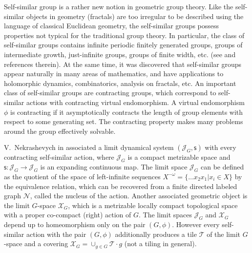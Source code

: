 \documentclass[12pt]{article}
\newcommand{\xmo}{X^{-\omega}}
\newcommand{\limGs}[1][G]{\mathcal{X}_{#1}}
\newcommand{\lims}[1][G]{\mathscr{J}_{#1}}
\newcommand{\si}{\mathsf{s}}
\newcommand{\tile}{\mathscr{T}}
\newcommand{\nucl}{\mathcal{N}}
\theoremstyle{definition}
\begin{document}
Self-similar group is a rather new notion in geometric group theory. Like the self-similar objects
in geometry (fractals) are too irregular to be described using the language of classical Euclidean
geometry, the self-similar groups possess properties not typical for the traditional group theory.
In particular, the class of self-similar groups contains infinite periodic finitely generated
groups, groups of intermediate growth, just-infinite groups, groups of finite width, etc. (see
\cite{self_sim_groups,fractal_gr_sets,branch,gri:MilnorProb} and references therein). At the same
time, it was discovered that self-similar groups appear naturally in many areas of mathematics, and
have applications to holomorphic dynamics, combinatorics, analysis on fractals, etc. An important
class of self-similar groups are contracting groups, which correspond to self-similar actions with
contracting virtual endomorphism. A virtual endomorphism $\phi$ is contracting if it asymptotically
contracts the length of group elements with respect to some generating set. The contracting
property makes many problems around the group effectively solvable.











V.~Nekrashevych in \cite{self_sim_groups} associated a limit dynamical system $(\lims,\si)$ with
every contracting self-similar action, where $\lims$ is a compact metrizable space and
$\si:\lims\rightarrow\lims$ is an expanding continuous map. The limit space $\lims$ can be defined
as the quotient of the space of left-infinite sequences $\xmo=\{\ldots x_2x_1 | x_i\in X\}$ by the
equivalence relation, which can be recovered from a finite directed labeled graph $\nucl$, called
the nucleus of the action. Another associated geometric object is the limit $G$-space $\limGs$,
which is a metrizable locally compact topological space with a proper co-compact (right) action of
$G$. The limit spaces $\lims$ and $\limGs$ depend up to homeomorphism only on the pair $(G,\phi)$.
However every self-similar action with the pair $(G,\phi)$ additionally produces a tile $\tile$ of
the limit $G$-space and a covering $\limGs=\cup_{g\in G}\tile\cdot g$ (not a tiling in general).
\end{document}
